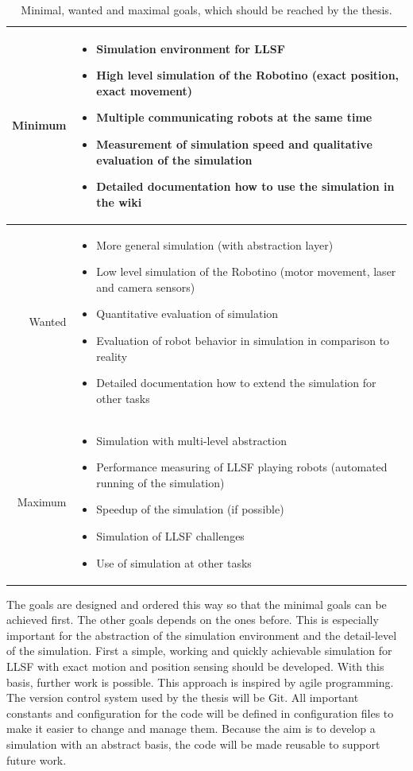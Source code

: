 \documentclass[11pt,a4paper,titlepage]{article}
\begin{document}
\begin{table}
\begin{tabular}{|r||p{10cm}|}
\hline
Minimum & \begin{itemize}
\item Simulation environment for LLSF
\item High level simulation of the Robotino (exact position, exact movement)
\item Multiple communicating robots at the same time
\item Measurement of simulation speed and qualitative evaluation of the simulation
\item Detailed documentation how to use the simulation in the wiki
\end{itemize}\\ \hline
Wanted & \begin{itemize}
\item More general simulation (with abstraction layer)
\item Low level simulation of the Robotino (motor movement, laser and camera sensors)
\item Quantitative evaluation of simulation
\item Evaluation of robot behavior in simulation in comparison to reality
\item Detailed documentation how to extend the simulation for other tasks
\end{itemize}\\ \hline
Maximum & \begin{itemize}
\item Simulation with multi-level abstraction
\item Performance measuring of LLSF playing robots (automated running of the simulation)
\item Speedup of the simulation (if possible)
\item Simulation of LLSF challenges
\item Use of simulation at other tasks
\end{itemize}\\
\hline
\end{tabular}
\label{Table 1}
\caption{Minimal, wanted and maximal goals, which should be reached by the thesis.}
\end{table}
The goals are designed and ordered this way so that the minimal goals can be achieved first. The other goals depends on the ones before. This is especially important for the abstraction of the simulation environment and the detail-level of the simulation. First a simple, working and quickly achievable simulation for LLSF with exact motion and position sensing should be developed. With this basis, further work is possible. This approach is inspired by agile programming. The version control system used by the thesis will be Git. All important constants and configuration for the code will be defined in configuration files to make it easier to change and manage them. Because the aim is to develop a simulation with an abstract basis, the code will be made reusable to support future work.\\
\end{document}

